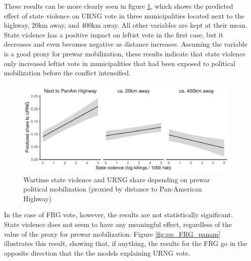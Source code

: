 \documentclass[12pt, notitlepage]{article}
\begin{document}


These results can be more clearly seen in figure \ref{fig:pp_URNG_panam}, which shows the predicted effect of state violence on URNG vote in three municipalities located next to the highway, 20km away, and 400km away.
All other variables are kept at their mean.
State violence has a positive impact on leftist vote in the first case, but it decreases and even becomes negative as distance increases.
Assuming the variable is a good proxy for prewar mobilization, these results indicate that state violence only increased leftist vote in municipalities that had been exposed to political mobilization before the conflict intensified.

\begin{figure}[htb!]
  \centering
    \includegraphics[width = .75\textwidth]{img/pp_URNG_panam}

  \caption{Wartime state violence and URNG share depending on prewar political mobilization (proxied by distance to Pan-American Highway)} \label{fig:pp_URNG_panam}


\end{figure}

In the case of FRG vote, however, the results are not statistically significant.
State violence does not seem to have any meaningful effect, regardless of the value of the proxy for prewar mobilization.
Figure \ref{fig:pp_FRG_panam} illustrates this result, showing that, if anything, the results for the FRG go in the opposite direction that the the models explaining URNG vote.
\end{document}
